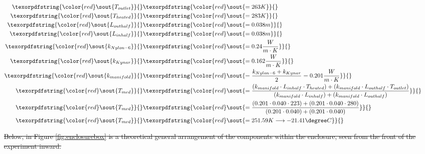 \documentclass[a4paper,12pt,twoside, final]{article}
\providecommand{\DIFdeltex}[1]{{\protect\color{red}\sout{#1}}}                      %
\providecommand{\DIFdelbegin}{} %
\providecommand{\DIFdel}[1]{\texorpdfstring{\DIFdeltex{#1}}{}} %
\newcommand{\DIFscaledelfig}{0.5}
\newlength{\DIFdelgraphicswidth} %
\newlength{\DIFdelgraphicsheight} %
\newcommand{\DIFdelincludegraphics}[2][]{%
\sbox{\DIFdelgraphicsbox}{\DIFOincludegraphics[#1]{#2}}%
\settoboxwidth{\DIFdelgraphicswidth}{\DIFdelgraphicsbox} %
\settoboxtotalheight{\DIFdelgraphicsheight}{\DIFdelgraphicsbox} %
\scalebox{\DIFscaledelfig}{%
\parbox[b]{\DIFdelgraphicswidth}{\usebox{\DIFdelgraphicsbox}\\[-\baselineskip] \rule{\DIFdelgraphicswidth}{0em}}\llap{\resizebox{\DIFdelgraphicswidth}{\DIFdelgraphicsheight}{%
\setlength{\unitlength}{\DIFdelgraphicswidth}%
\begin{picture}(1,1)%
\thicklines\linethickness{2pt} %
{\color[rgb]{1,0,0}\put(0,0){\framebox(1,1){}}}%
{\color[rgb]{1,0,0}\put(0,0){\line( 1,1){1}}}%
{\color[rgb]{1,0,0}\put(0,1){\line(1,-1){1}}}%
\end{picture}%
}\hspace*{3pt}}} %
} %
\DeclareRobustCommand{\DIFdelbegin}{\DIFOdelbegin \let\includegraphics\DIFdelincludegraphics} %
\begin{document}
\DIFdelbegin \begin{align*}
    \DIFdel{T_{outlet} }&\DIFdel{= 263 K}\\
    \DIFdel{T_{heated} }&\DIFdel{= 283 K}\\
    \DIFdel{L_{outhalf}}& \DIFdel{= 0.038 m}\\
    \DIFdel{L_{inhalf} }&\DIFdel{= 0.038 m}\\
    \DIFdel{k_{Nylon-6} }&\DIFdel{= 0.24\frac{W}{m\cdot K}}\\
    \DIFdel{k_{Kynar} }&\DIFdel{= 0.162\frac{W}{m\cdot K}}\\
    \DIFdel{k_{manifold} }&\DIFdel{=  \frac{k_{Nylon-6}+k_{Kynar}}{2} = 0.201\frac{W}{m\cdot K}}\\
    \DIFdel{T_{med} }&\DIFdel{= \frac{ (k_{manifold}\cdot L_{inhalf}\cdot T_{heated}) + (k_{manifold}\cdot L_{outhalf}\cdot T_{outlet}) }{ (k_{manifold}\cdot L_{inhalf}) + (k_{manifold}\cdot L_{outhalf})}}\\
    \DIFdel{T_{med} }&\DIFdel{= \frac{ (0.201\cdot 0.040\cdot 223) + (0.201\cdot 0.040\cdot 280)}{(0.201\cdot 0.040) + (0.201\cdot 0.040)}}\\ 
    \DIFdel{T_{med} }&\DIFdel{= 251.59 K \longrightarrow -21.41\degree C
 }\end{align*}

\DIFdel{Below, in Figure \ref{fig:enclosurebox} is a theoretical general arrangement of the components within the enclosure, seen from the front of the experiment inward.
}%
\end{document}

